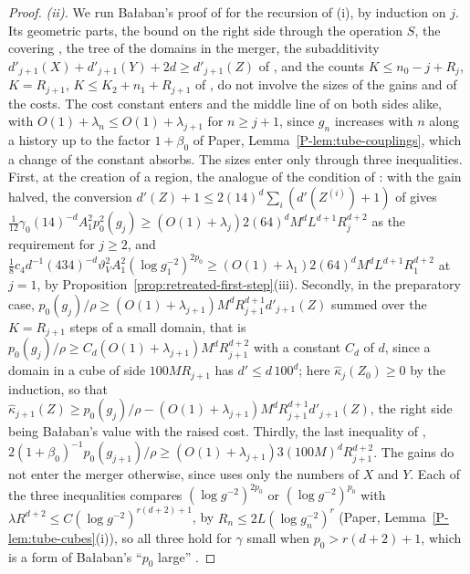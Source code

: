 \documentclass[11pt]{preprint}
\numberwithin{equation}{section}
\theoremstyle{definition}
\theoremstyle{remark}
\theoremstyle{plain}
\begin{document}
\begin{proof}
\emph{(ii).} We run Ba{\l}aban's proof of \cite[(1.80)]{BalabanLFR2} \cite[pp.~384--387]{BalabanLFR2} for the recursion of (i), by induction on $j$. Its geometric parts, the bound \cite[(1.81)]{BalabanLFR2} on the right side through the operation $S$, the covering \cite[(1.84)]{BalabanLFR2}, the tree of the domains in the merger, the subadditivity $d'_{j+1}(X) + d'_{j+1}(Y) + 2d \geq d'_{j+1}(Z)$ of \cite[p.~386]{BalabanLFR2}, and the counts $K \leq n_0 - j + R_j$, $K = R_{j+1}$, $K \leq K_2 + n_1 + R_{j+1}$ of \cite[pp.~385--387]{BalabanLFR2}, do not involve the sizes of the gains and of the costs. The cost constant enters \cite[(1.81), (1.83), (1.87)]{BalabanLFR2} and the middle line of \cite[(1.88)]{BalabanLFR2} on both sides alike, with $O(1) + \lambda_n \leq O(1) + \lambda_{j+1}$ for $n \geq j + 1$, since $g_n$ increases with $n$ along a history up to the factor $1 + \beta_0$ of Paper, Lemma~\ref{P-lem:tube-couplings}, which a change of the constant absorbs. The sizes enter only through three inequalities. First, at the creation of a region, the analogue of the condition of \cite[p.~385]{BalabanLFR2}: with the gain halved, the conversion $d'(Z) + 1 \leq 2(14)^d\sum_i(d'(Z^{(i)}) + 1)$ of \cite[p.~385]{BalabanLFR2} gives $\frac{1}{12}\gamma_0(14)^{-d}A_1^2p_0^2(g_j) \geq (O(1) + \lambda_j)2(64)^dM^dL^{d+1}R_j^{d+2}$ as the requirement for $j \geq 2$, and $\frac18c_4d^{-1}(434)^{-d}\vartheta_V^2A_1^2(\log g_1^{-2})^{2p_0} \geq (O(1) + \lambda_1)2(64)^dM^dL^{d+1}R_1^{d+2}$ at $j = 1$, by Proposition~\ref{prop:retreated-first-step}(iii). Secondly, in the preparatory case, $p_0(g_j)/\rho \geq (O(1) + \lambda_{j+1})M^dR_{j+1}^{d+1}d'_{j+1}(Z)$ summed over the $K = R_{j+1}$ steps of a small domain, that is $p_0(g_j)/\rho \geq C_d(O(1) + \lambda_{j+1})M^dR_{j+1}^{d+2}$ with a constant $C_d$ of $d$, since a domain in a cube of side $100MR_{j+1}$ has $d' \leq d\,100^d$; here $\hat\kappa_j(Z_0) \geq 0$ by the induction, so that $\hat\kappa_{j+1}(Z) \geq p_0(g_j)/\rho - (O(1) + \lambda_{j+1})M^dR_{j+1}^{d+1}d'_{j+1}(Z)$, the right side being Ba{\l}aban's value with the raised cost. Thirdly, the last inequality of \cite[(1.88)]{BalabanLFR2}, $2(1 + \beta_0)^{-1}p_0(g_{j+1})/\rho \geq (O(1) + \lambda_{j+1})3(100M)^dR_{j+1}^{d+2}$. The gains do not enter the merger otherwise, since \cite[(1.86)]{BalabanLFR2} uses only the numbers of $X$ and $Y$. Each of the three inequalities compares $(\log g^{-2})^{2p_0}$ or $(\log g^{-2})^{p_0}$ with $\lambda R^{d+2} \leq C(\log g^{-2})^{r(d+2)+1}$, by $R_n \leq 2L(\log g_n^{-2})^r$ (Paper, Lemma~\ref{P-lem:tube-cubes}(i)), so all three hold for $\gamma$ small when $p_0 > r(d + 2) + 1$, which is a form of Ba{\l}aban's ``$p_0$ large'' \cite[pp.~385, 387]{BalabanLFR2}.


\end{proof}
\end{document}
